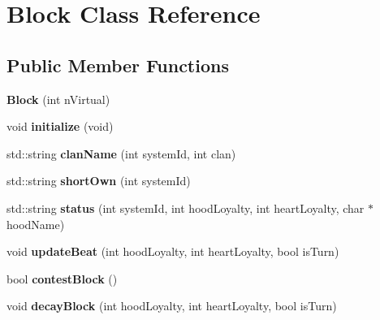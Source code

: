 \hypertarget{classBlock}{\section{Block Class Reference}
\label{classBlock}
}
\subsection*{Public Member Functions}
\begin{DoxyCompactItemize}
\item 
\hypertarget{classBlock_a86fa6c69e85d6d72a39c2bede6e283a6}{{\bfseries Block} (int n\-Virtual)}\label{classBlock_a86fa6c69e85d6d72a39c2bede6e283a6}

\item 
\hypertarget{classBlock_a4ce7c14cd53f4bd28d88c49e818efac6}{void {\bfseries initialize} (void)}\label{classBlock_a4ce7c14cd53f4bd28d88c49e818efac6}

\item 
\hypertarget{classBlock_a2007116298de0c700f37a14096569816}{std\-::string {\bfseries clan\-Name} (int system\-Id, int clan)}\label{classBlock_a2007116298de0c700f37a14096569816}

\item 
\hypertarget{classBlock_a9223f4b110b49f645fed119f4f25e48e}{std\-::string {\bfseries short\-Own} (int system\-Id)}\label{classBlock_a9223f4b110b49f645fed119f4f25e48e}

\item 
\hypertarget{classBlock_abcb33df5c14f06df6a16b6ee5a337bdd}{std\-::string {\bfseries status} (int system\-Id, int hood\-Loyalty, int heart\-Loyalty, char $\ast$hood\-Name)}\label{classBlock_abcb33df5c14f06df6a16b6ee5a337bdd}

\item 
\hypertarget{classBlock_a1fb255ff20b8b4ad71daf96fe8434c0d}{void {\bfseries update\-Beat} (int hood\-Loyalty, int heart\-Loyalty, bool is\-Turn)}\label{classBlock_a1fb255ff20b8b4ad71daf96fe8434c0d}

\item 
\hypertarget{classBlock_acd93660e205566d69a0a43987944a3b5}{bool {\bfseries contest\-Block} ()}\label{classBlock_acd93660e205566d69a0a43987944a3b5}

\item 
\hypertarget{classBlock_acacdd9c24b1e8725f6e88eddd5d4384a}{void {\bfseries decay\-Block} (int hood\-Loyalty, int heart\-Loyalty, bool is\-Turn)}\label{classBlock_acacdd9c24b1e8725f6e88eddd5d4384a}


\end{DoxyCompactItemize}
